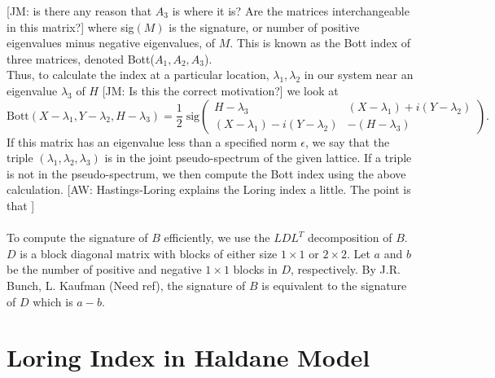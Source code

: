 \documentclass[a4paper]{article}
\newcommand{\aw}[1]{{\color{blue} [AW: #1]}}
\newcommand{\jm}[1]{{\color{red} [JM: #1]}}
\begin{document}
\jm{is there any reason that $A_3$ is where it is? Are the matrices interchangeable in this matrix?}
where sig$(M)$ is the signature, or number of positive eigenvalues minus negative eigenvalues, of $M$.
This is known as the Bott index of three matrices, denoted Bott($A_1,A_2,A_3$).\\
Thus, to calculate the index at a particular location, $\lambda_1,\lambda_2$ in our system near an eigenvalue $\lambda_3$ of $H$ \jm{Is this the correct motivation?} we look at
$$\text{Bott}(X-\lambda_1,Y - \lambda_2, H - \lambda_3) = \frac{1}{2}\; \text{sig}\begin{pmatrix}
H - \lambda_3 & (X - \lambda_1) + i(Y - \lambda_2)\\
(X - \lambda_1) - i(Y - \lambda_2) & - (H - \lambda_3)
\end{pmatrix}.$$
If this matrix has an eigenvalue less than a specified norm $\epsilon$, we say that the triple $(\lambda_1,\lambda_2,\lambda_3)$ is in the joint pseudo-spectrum of the given lattice.
If a triple is not in the pseudo-spectrum, we then compute the Bott index using the above calculation. \aw{Hastings-Loring explains the Loring index a little. The point is that } \\\\
To compute the signature of $B$ efficiently, we use the $LDL^T$ decomposition of $B$.
$D$ is a block diagonal matrix with blocks of either size $1 \times 1$ or $2 \times 2$.
Let $a$ and $b$ be the number of positive and negative $1 \times 1$ blocks in $D$, respectively.
By J.R. Bunch, L. Kaufman (Need ref), the signature of $B$ is equivalent to the signature of $D$ which is $a - b$.

\section{Loring Index in Haldane Model}
\end{document}
